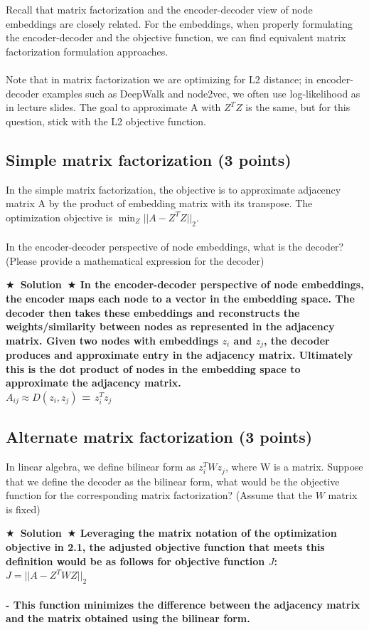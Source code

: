 \documentclass{article}
\numberwithin{figure}{section}
\newcommand{\Solution}[1]{{\medskip \color{red} \bf $\bigstar$~\sf \textbf{Solution}~$\bigstar$ \sf #1 } \bigskip}
\begin{document}
Recall that matrix factorization and the encoder-decoder view of node embeddings are closely related. For the embeddings, when properly formulating the encoder-decoder and the objective function, we can find equivalent matrix factorization formulation approaches.\\
\\
    Note that in matrix factorization we are optimizing for L2 distance; in encoder-decoder examples such as DeepWalk and node2vec, we often use log-likelihood as in lecture slides. The goal to approximate A with $Z^TZ$ is the same, but for this question, stick with the L2 objective function.
\subsection{Simple matrix factorization (3 points)}
In the simple matrix factorization, the objective is to approximate adjacency matrix A by the product of embedding matrix with its transpose. The optimization objective is $\min_Z ||A - Z^TZ||_2$.\\
\\
In the encoder-decoder perspective of node embeddings, what is the decoder? (Please provide a mathematical expression for the decoder)

\Solution{In the encoder-decoder perspective of node embeddings, the encoder maps each node to a vector in the embedding space. The decoder then takes these embeddings and reconstructs the weights/similarity between nodes as represented in the adjacency matrix. Given two nodes with embeddings $z_i$ and $z_j$, the decoder produces and approximate entry in the adjacency matrix. Ultimately this is the dot product of nodes in the embedding space to approximate the adjacency matrix.
\\
\( A_{ij} \approx D(z_i,z_j) \) = $z_i^Tz_j$}



\subsection{Alternate matrix factorization (3 points)}
In linear algebra, we define bilinear form as $z_i^T W z_j$, where W is a matrix. Suppose that we define the decoder as the bilinear form, what would be the objective function for the corresponding matrix factorization? (Assume that the $W$ matrix is fixed)

\Solution{ Leveraging the matrix notation of the optimization objective in 2.1, the adjusted objective function that meets this definition would be as follows for objective function $J$:\\

$J = || A - Z^{T}WZ||_2$
\\\\
- This function minimizes the difference between the adjacency matrix and the matrix obtained using the bilinear form.


}
\end{document}
